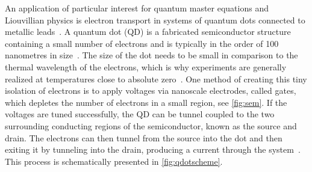 \documentclass[../main.tex]{subfiles}
\begin{document}
An application of particular interest for quantum master equations and Liouvillian physics is electron transport in systems of quantum dots connected to metallic leads~\cite{qdottrans}. A quantum dot (QD) is a fabricated semiconductor structure containing a small number of electrons and is typically in the order of 100 nanometres in size~\cite{qdotmarcus}. The size of the dot needs to be small in comparison to the thermal wavelength of the electrons, which is why experiments are generally realized at temperatures close to absolute zero~\cite{etrans}. One method of creating this tiny isolation of electrons is to apply voltages via nanoscale electrodes, called gates, which depletes the number of electrons in a small region, see \cref{fig:sem}. If the voltages are tuned successfully, the QD can be tunnel coupled to the two surrounding conducting regions of the semiconductor, known as the source and drain. The electrons can then tunnel from the source into the dot and then exiting it by tunneling into the drain, producing a current through the system~\cite{qdotmarcus}. This process is schematically presented in \cref{fig:qdotscheme}.
\end{document}
